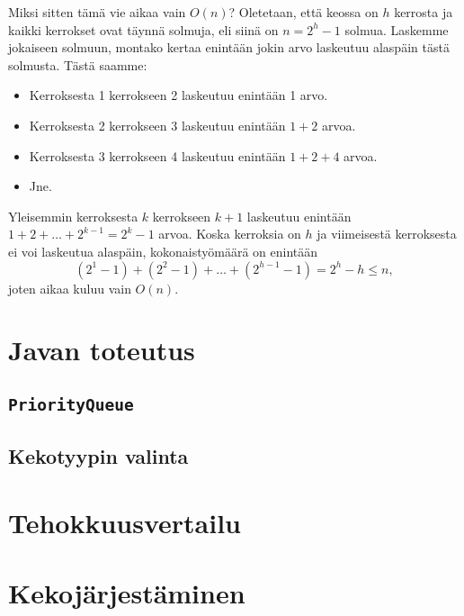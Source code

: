 Miksi sitten tämä vie aikaa vain $O(n)$?
Oletetaan, että keossa on $h$ kerrosta ja kaikki
kerrokset ovat täynnä solmuja, eli siinä on $n=2^h-1$ solmua.
Laskemme jokaiseen solmuun, montako kertaa enintään jokin
arvo laskeutuu alaspäin tästä solmusta. Tästä saamme:

\begin{itemize}
\item Kerroksesta 1 kerrokseen 2 laskeutuu enintään 1 arvo.
\item Kerroksesta 2 kerrokseen 3 laskeutuu enintään $1+2$ arvoa.
\item Kerroksesta 3 kerrokseen 4 laskeutuu enintään $1+2+4$ arvoa.
\item Jne.
\end{itemize}

Yleisemmin kerroksesta $k$ kerrokseen $k+1$ laskeutuu
enintään $1+2+\dots+2^{k-1} = 2^k-1$ arvoa.
Koska kerroksia on $h$ ja viimeisestä kerroksesta ei voi laskeutua alaspäin,
kokonaistyömäärä on enintään
\[(2^1-1)+(2^2-1)+\dots+(2^{h-1}-1)=2^h-h \le n,\]
joten aikaa kuluu vain $O(n)$.

\section{Javan toteutus}

\subsection{\texttt{PriorityQueue}}

\subsection{Kekotyypin valinta}

\section{Tehokkuusvertailu}

\section{Kekojärjestäminen}
